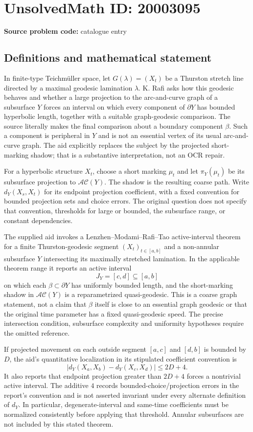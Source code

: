 \documentclass[11pt]{article}
\begin{document}
\section*{UnsolvedMath ID: 20003095}
\textbf{Source problem code:} catalogue entry
\subsection{Definitions and mathematical statement}
In finite-type Teichm\"uller space, let $G(\lambda)=(X_t)$ be a Thurston stretch line directed by a maximal geodesic lamination $\lambda$. K. Rafi asks how this geodesic behaves and whether a large projection to the arc-and-curve graph of a subsurface $Y$ forces an interval on which every component of $\partial Y$ has bounded hyperbolic length, together with a suitable graph-geodesic comparison. The source literally makes the final comparison about a boundary component $\beta$. Such a component is peripheral in $Y$ and is not an essential vertex of its usual arc-and-curve graph. The aid explicitly replaces the subject by the projected short-marking shadow; that is a substantive interpretation, not an OCR repair.

For a hyperbolic structure $X_t$, choose a short marking $\mu_t$ and let $\pi_Y(\mu_t)$ be its subsurface projection to $\mathcal{AC}(Y)$. The shadow is the resulting coarse path. Write $d_Y(X_s,X_t)$ for its endpoint projection coefficient, with a fixed convention for bounded projection sets and choice errors. The original question does not specify that convention, thresholds for large or bounded, the subsurface range, or constant dependencies.

The supplied aid invokes a Lenzhen--Modami--Rafi--Tao active-interval theorem for a finite Thurston-geodesic segment $(X_t)_{t\in[a,b]}$ and a non-annular subsurface $Y$ intersecting its maximally stretched lamination. In the applicable theorem range it reports an active interval
\[
 J_Y=[c,d]\subseteq[a,b]
\]
on which each $\beta\subset\partial Y$ has uniformly bounded length, and the short-marking shadow in $\mathcal{AC}(Y)$ is a reparametrized quasi-geodesic. This is a coarse graph statement, not a claim that $\beta$ itself is close to an essential graph geodesic or that the original time parameter has a fixed quasi-geodesic speed. The precise intersection condition, subsurface complexity and uniformity hypotheses require the omitted reference.

If projected movement on each outside segment $[a,c]$ and $[d,b]$ is bounded by $D$, the aid's quantitative localization in its stipulated coefficient convention is
\[
 \bigl|d_Y(X_a,X_b)-d_Y(X_c,X_d)\bigr|\leq2D+4.
\]
It also reports that endpoint projection greater than $2D+4$ forces a nontrivial active interval. The additive $4$ records bounded-choice/projection errors in the report's convention and is not asserted invariant under every alternate definition of $d_Y$. In particular, degenerate-interval and same-time coefficients must be normalized consistently before applying that threshold. Annular subsurfaces are not included by this stated theorem.
\end{document}

